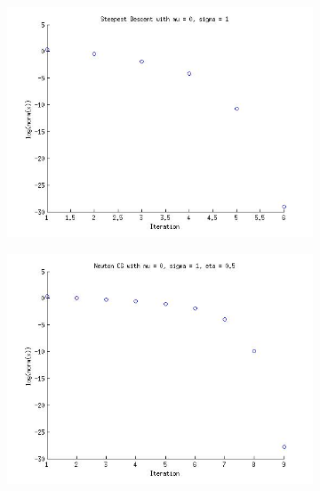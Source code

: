 \documentclass{article}
\begin{document}
\begin{figure}[!htb]
        \centering
        \begin{subfigure}[bh]{0.45\textwidth}
                \includegraphics[width=\textwidth]{figs/P3SDmu0sig1.jpg}
        \end{subfigure}%
        \begin{subfigure}[bh]{0.45\textwidth}
                \includegraphics[width=\textwidth]{figs/P3NCGmu0sig1eta1.jpg}
        \end{subfigure}
        \centering
        \begin{subfigure}[bh]{0.45\textwidth}

\end{subfigure}
\end{figure}
\end{document}
